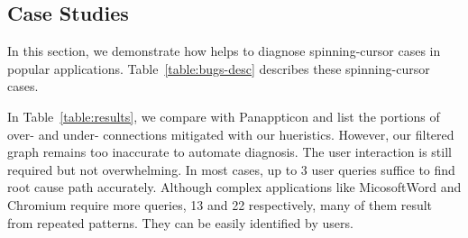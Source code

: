 \subsection{Case Studies}\label{sec:casestudy}

In this section, we demonstrate how \xxx helps to diagnose \nbug
spinning-cursor cases in popular applications. Table~\ref{table:bugs-desc}
describes these spinning-cursor cases.


In Table~\ref{table:results}, we compare \xxx with Panappticon and list the
portions of over- and under- connections mitigated with our hueristics.
However, our filtered graph remains too inaccurate to automate diagnosis.  The
user interaction is still required but not overwhelming. In most cases, up to 3
user queries suffice to find root cause path accurately. Although complex
applications like MicosoftWord and Chromium require more queries, 13 and 22
respectively, many of them result from repeated patterns. They can be easily
identified by users.

